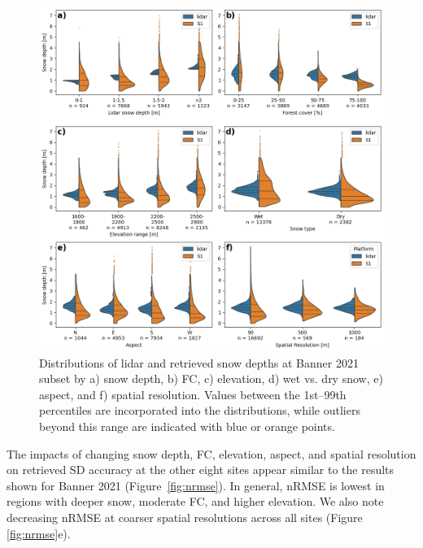 \documentclass[journal abbreviation, manuscript]{copernicus}
\begin{document}
\begin{figure}[htbp]
    \centering
    \includegraphics[width=\textwidth]{figures/violins_banner.png}
    \caption{Distributions of lidar and retrieved snow depths at Banner 2021 subset by a) snow depth, b) FC, c) elevation, d) wet vs. dry snow, e) aspect, and f) spatial resolution. Values between the 1st--99th percentiles are incorporated into the distributions, while outliers beyond this range are indicated with blue or orange points.}
    \label{fig:violins_banner}
\end{figure}

The impacts of changing snow depth, FC, elevation, aspect, and spatial resolution on retrieved SD accuracy at the other eight sites appear similar to the results shown for Banner 2021 (Figure~\ref{fig:nrmse}). In general, nRMSE is lowest in regions with deeper snow, moderate FC, and higher elevation. We also note decreasing nRMSE at coarser spatial resolutions across all sites (Figure \ref{fig:nrmse}e).
\end{document}
